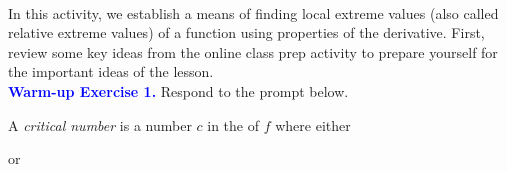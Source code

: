 \documentclass[10pt]{article}
\begin{document}
\vspace{-0.5cm}

\hrulefill\\
In this activity, we establish a means of finding local extreme values (also called relative extreme values) of a function using properties of the derivative. First, review some key ideas from the online class prep activity to prepare yourself for the important ideas of the lesson.\\

{\bf \textcolor{blue}{Warm-up Exercise 1.}}  Respond to the prompt below.
%
    {
    A {\em critical number} is  a number $c$ in the  of $f$ where either
  \begin{center}  \quad\quad\quad or \quad\quad\quad {} \end{center}
    }
    
\end{document}
